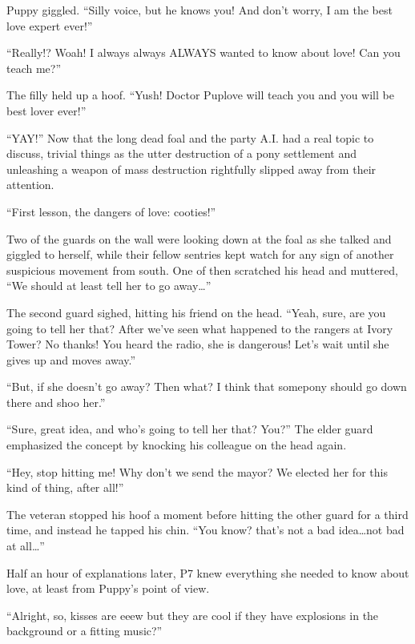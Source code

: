 Puppy giggled. ``Silly voice, but he knows you! And don't worry, I am the best love expert ever!''

``Really!? Woah! I always always ALWAYS wanted to know about love! Can you teach me?''

The filly held up a hoof. ``Yush! Doctor Puplove will teach you and you will be best lover ever!''

``YAY!'' Now that the long dead foal and the party A.I. had a real topic to discuss, trivial things as the utter destruction of a pony settlement and unleashing a weapon of mass destruction rightfully slipped away from their attention.

``First lesson, the dangers of love: cooties!''

\horizonline


Two of the guards on the wall were looking down at the foal as she talked and giggled to herself, while their fellow sentries kept watch for any sign of another suspicious movement from south. One of then scratched his head and muttered, ``We should at least tell her to go away\dots''

The second guard sighed, hitting his friend on the head. ``Yeah, sure, are you going to tell her that? After we've seen what happened to the rangers at Ivory Tower? No thanks! You heard the radio, she is dangerous! Let's wait until she gives up and moves away.''

``But, if she doesn't go away? Then what? I think that somepony should go down there and shoo her.''

``Sure, great idea, and who's going to tell her that? You?'' The elder guard emphasized the concept by knocking his colleague on the head again.

``Hey, stop hitting me! Why don't we send the mayor? We elected her for this kind of thing, after all!''

The veteran stopped his hoof a moment before hitting the other guard for a third time, and instead he tapped his chin. ``You know? that's not a bad idea\dots not bad at all\dots''

\horizonline


Half an hour of explanations later, P7 knew everything she needed to know about love, at least from Puppy's point of view.

``Alright, so, kisses are eeew but they are cool if they have explosions in the background or a fitting music?''

